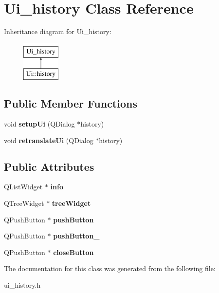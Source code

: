 \hypertarget{classUi__history}{
\section{Ui\_\-history Class Reference}
\label{classUi__history}
}
Inheritance diagram for Ui\_\-history:\begin{figure}[H]
\begin{center}
\leavevmode
\includegraphics[height=2.000000cm]{classUi__history}
\end{center}
\end{figure}
\subsection*{Public Member Functions}
\begin{DoxyCompactItemize}
\item 
\hypertarget{classUi__history_a2fca8cb3073919a83d20d8beb211e489}{
void {\bfseries setupUi} (QDialog $\ast$history)}
\label{classUi__history_a2fca8cb3073919a83d20d8beb211e489}

\item 
\hypertarget{classUi__history_a09bc4c4501c23a46385d4dde46f2ac37}{
void {\bfseries retranslateUi} (QDialog $\ast$history)}
\label{classUi__history_a09bc4c4501c23a46385d4dde46f2ac37}

\end{DoxyCompactItemize}
\subsection*{Public Attributes}
\begin{DoxyCompactItemize}
\item 
\hypertarget{classUi__history_ad735c929553117f86647de09fef4bc7c}{
QListWidget $\ast$ {\bfseries info}}
\label{classUi__history_ad735c929553117f86647de09fef4bc7c}

\item 
\hypertarget{classUi__history_a276cc06c05a31289ab6d85cbdf233f50}{
QTreeWidget $\ast$ {\bfseries treeWidget}}
\label{classUi__history_a276cc06c05a31289ab6d85cbdf233f50}

\item 
\hypertarget{classUi__history_a7691a5d3d60ce064af93e73a3a784630}{
QPushButton $\ast$ {\bfseries pushButton}}
\label{classUi__history_a7691a5d3d60ce064af93e73a3a784630}

\item 
\hypertarget{classUi__history_a2d6dfc354da94241b8d00b1a15e2f6b9}{
QPushButton $\ast$ {\bfseries pushButton\_}}
\label{classUi__history_a2d6dfc354da94241b8d00b1a15e2f6b9}

\item 
\hypertarget{classUi__history_a9e18bf35bee38f50a27f4ef1425fae28}{
QPushButton $\ast$ {\bfseries closeButton}}
\label{classUi__history_a9e18bf35bee38f50a27f4ef1425fae28}

\end{DoxyCompactItemize}


The documentation for this class was generated from the following file:\begin{DoxyCompactItemize}
\item 
ui\_\-history.h\end{DoxyCompactItemize}
